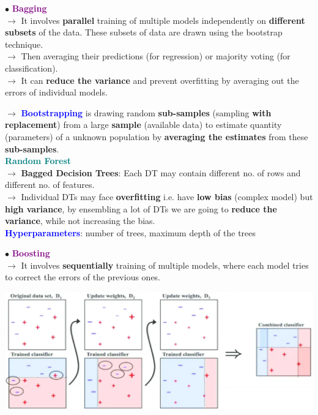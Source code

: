 \documentclass[letterpaper, 10.5pt,landscape]{article}
\begin{document}
\begin{multicols*}{3}
$\bullet$ \textbf{\textcolor{purple}{Bagging}} \\
$\rightarrow$ It involves \textbf{parallel} training of multiple models independently on \textbf{different subsets} of the data. These subsets of data are drawn using the bootstrap technique. \\
$\rightarrow$ Then averaging their predictions (for regression) or majority voting (for classification). \\
$\rightarrow$ It can \textbf{reduce the variance} and prevent overfitting by averaging out the errors of individual models.

\vspace{3pt}
$\rightarrow$ \textbf{\textcolor{blue}{Bootstrapping}} is drawing random \textbf{sub-samples} (sampling \textbf{with replacement}) from a large \textbf{sample} (available data) to estimate quantity (parameters) of a unknown population by \textbf{averaging the estimates} from these \textbf{sub-samples}. \\









\vspace{3pt}
\textcolor{teal}{\textbf{Random Forest}} \\
$\rightarrow$\textbf{ Bagged Decision Trees}: Each DT may contain different no. of rows and different no. of features. \\
$\rightarrow$ Individual DTs may face \textbf{overfitting} i.e. have \textbf{low bias} (complex model) but \textbf{high variance}, by ensembling a lot of DTs we are going to \textbf{reduce the variance}, while not increasing the bias. \\ 
\textbf{\textcolor{blue}{Hyperparameters}}: number of trees, maximum depth of the trees 

\vspace{7pt}
$\bullet$ \textbf{\textcolor{purple}{Boosting}} \\
$\rightarrow$ It involves \textbf{sequentially} training of multiple models, where each model tries to correct the errors of the previous ones.



\vspace{-5pt}
\begin{center}
    \begin{minipage}{\linewidth}
    \includegraphics[width=\textwidth]{figures/boosting.PNG}
    \end{minipage}
\end{center}
\vspace{-5pt}




\end{multicols*}
\end{document}
